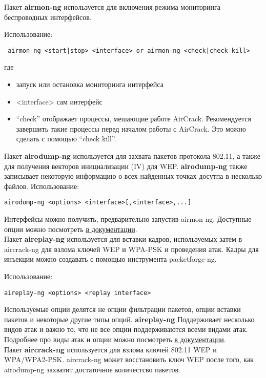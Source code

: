 \documentclass[10pt,a4paper,titlepage]{article}
\begin{document}
Пакет \textbf{airmon-ng} используется для включения режима мониторинга беспроводных интерфейсов.  

Использование:
\begin{verbatim}
 airmon-ng <start|stop> <interface> or airmon-ng <check|check kill>
\end{verbatim}
где
\begin{itemize}
\item <start|stop> запуск или остановка мониторинга интерфейса
\item <interface> сам интерфейс
\item <check|check kill> “check” отображает процессы, мешающие работе AirCrack. Рекомендуется завершить такие процессы перед началом работы с AirCrack. Это можно сделать с помощью “check kill”.
\end{itemize} 

Пакет \textbf{airodump-ng} используется для захвата пакетов протокола 802.11, а также для получения векторов инициализации (IV) для WEP. \textbf{airodump-ng} также записывает некоторую информацию о всех найденных точках досутпа в несколько файлов.
Использование:
\begin{verbatim}
airodump-ng <options> <interface>[,<interface>,...]
\end{verbatim}
Интерфейсы можно получить, предварительно запустив airmon-ng. Доступные опции можно посмотреть \href{http://www.aircrack-ng.org/doku.php?id=airodump-ng}{в документации}.\\


Пакет \textbf{aireplay-ng} используется для вставки кадров, используемых затем в aircrack-ng для взлома ключей WEP и WPA-PSK и проведения атак. Кадры для инъекции можно создавать с помощью инструмента packetforge-ng.

Использование:   
\begin{verbatim}
aireplay-ng <options> <replay interface>
\end{verbatim}
Используемые опции делятся не опции фильтрации пакетов, опции вставки пакетов и некоторые другие типы опций. \textbf{aireplay-ng} Поддерживает несколько видов атак и важно то, что не все опции поддерживаются всеми видами атак. Подробнее про виды атак и опции можно посмотреть \href{http://www.aircrack-ng.org/doku.php?id=aireplay-ng}{в документации}.\\

Пакет \textbf{aircrack-ng} используется для взлома ключей 802.11 WEP и WPA/WPA2-PSK. aircrack-ng может восстановить ключ WEP после того, как airodump-ng захватит достаточное количестсво пакетов. 
\end{document}
